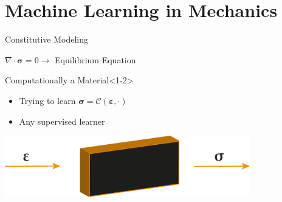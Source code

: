 \section{Machine Learning in Mechanics}

\begin{frame}{Constitutive Modeling}
\begin{center}
  $\nabla \cdot \boldsymbol{\sigma} =0 \to  $ Equilibrium Equation 
\end{center}
  
\begin{minipage}{0.45\textwidth}
  \begin{block}{\color{White} Computationally a Material}<1-2>
    \begin{itemize}
        \item <1> Trying to learn $\boldsymbol{\sigma}=\mathcal{C}(\boldsymbol{\varepsilon,\cdot})$ 
        \item <2> Any supervised learner
      \end{itemize}
    \end{block} 
  \end{minipage}%
  \hspace{1cm}
  \begin{minipage}{0.45\textwidth}
    \centering
    \includegraphics[width=0.8\textwidth]{Figures/surrogate/material.pdf}
  \end{minipage}
  \end{frame}

